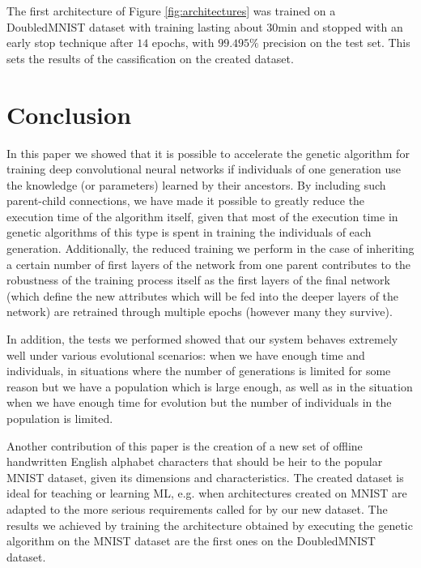 \documentclass[eng]{simposium}
\begin{document}
The first architecture of Figure \ref{fig:architectures} was trained on a DoubledMNIST dataset with training lasting about 
$30$min and stopped with an early stop technique after $14$ epochs, with $99.495\%$ precision on the test set. 
This sets the results of the cassification on the created dataset. 

\section{Conclusion}

In this paper we showed that it is possible to accelerate the genetic algorithm for training deep convolutional neural networks
if individuals of one generation use the knowledge (or parameters) learned by their ancestors.
By including such parent-child connections, we have made it possible to greatly reduce the execution time of the algorithm itself, given that
most of the execution time in genetic algorithms of this type is spent in training the individuals of each generation.
Additionally, the reduced training we perform in the case of inheriting a certain number of first layers of the network from one parent
contributes to the robustness of the training process itself as the first layers of the final network (which define the new attributes
which will be fed into the deeper layers of the network) are retrained through multiple epochs (however many they survive).

In addition, the tests we performed showed that our system behaves extremely well under various evolutional scenarios:
when we have enough time and individuals, in situations where the number of generations is limited for some reason but we have
a population which is large enough,
as well as in the situation when we have enough time for evolution but the number of individuals in the population is limited.

Another contribution of this paper is the creation of a new set of offline handwritten English alphabet characters that should be
heir to the popular MNIST dataset, given its dimensions and characteristics. The created dataset is ideal
for teaching or learning ML, e.g. when architectures created on MNIST are adapted to the more serious requirements called for 
by our new dataset.
The results we achieved by training the architecture obtained by executing the genetic algorithm on the MNIST dataset are
the first ones on the DoubledMNIST dataset.

\newpage
\end{document}

